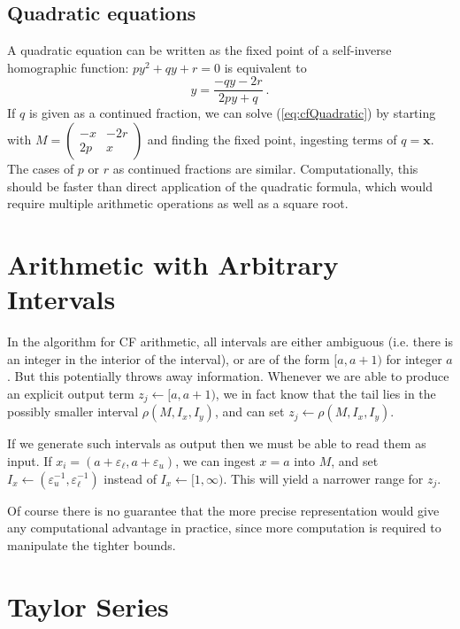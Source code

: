 \documentclass[11pt, oneside]{amsart}   	%
\renewcommand{\:}{\negthickspace:\negthickspace}
\begin{document}
\subsection{Quadratic equations}
A quadratic equation can be written as the fixed point of a self-inverse homographic function:
$
py^2 + qy + r = 0
$
is equivalent to
\begin{equation}\label{eq:cfQuadratic}
y = \frac{-qy - 2r}{2py + q}\ .
\end{equation}
If $q$ is given as a continued fraction, we can solve (\ref{eq:cfQuadratic}) by starting with $M= \left(
\begin{smallmatrix} 
-x & -2r \\ 
2p & x 
\end{smallmatrix}
\right)$ and finding the fixed point, ingesting terms of  $q=\mathbf{x}$. The cases of $p$ or $r$ as continued fractions are similar.
Computationally, this should be faster than direct application of the quadratic formula, which would require multiple arithmetic operations as well as a square root.


\section{Arithmetic with Arbitrary Intervals}
In the algorithm for CF arithmetic, all intervals are either ambiguous (i.e. there is an integer in the interior of the interval), or are of the form $[a,a+1)$ for integer $a$. But this potentially throws away information.
Whenever we are able to produce an explicit output term $z_j \leftarrow [a,a+1)$, we in fact know that the tail lies in the possibly smaller interval $\rho(M,I_x, I_y)$, and can set $z_j \leftarrow \rho(M,I_x, I_y)$.

If we generate such intervals as output then we must be able to read them as input. If $x_i = (a+\varepsilon_\ell, a+\varepsilon_u)$, we can ingest $x=a$ into $M$, and set $I_x \leftarrow (\varepsilon_u^{-1}, \varepsilon_\ell^{-1})$ instead of $I_x \leftarrow [1,\infty)$. This will yield a narrower range for $z_j$.

Of course there is no guarantee that the more precise representation would give any computational advantage in practice, since more computation is required to manipulate the tighter bounds.


\section{Taylor Series}
\end{document}
